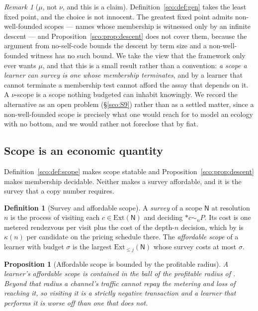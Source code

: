 \documentclass[11pt]{article}
\theoremstyle{plain}
\newtheorem{proposition}[theorem]{Proposition}
\theoremstyle{definition}
\newtheorem{definition}[theorem]{Definition}
\theoremstyle{remark}
\newtheorem{remark}[theorem]{Remark}
\newcommand{\Nsp}{\mathsf{N}}
\newcommand{\drop}[1]{*#1}
\newcommand{\bisimn}[1]{\sim_{#1}}
\newcommand{\Ext}{\mathrm{Ext}}
\begin{document}
\begin{remark}[$\mu$, not $\nu$, and this is a claim]\label{sco:rem:munu}
Definition~\ref{sco:def:gen} takes the least fixed point, and the choice is
not innocent. The greatest fixed point admits non-well-founded scopes ---
names whose membership is witnessed only by an infinite descent --- and
Proposition~\ref{sco:prop:descent} does not cover them, because the
argument from no-self-code bounds the descent by term size and a
non-well-founded witness has no such bound. We take the view that the
framework only ever wants $\mu$, and that this is a small result rather
than a convention: \emph{a scope a learner can survey is one whose
membership terminates}, and by \cite[\S6]{scientist} a learner that cannot
terminate a membership test cannot afford the assay that depends on it. A
$\nu$-scope is a scope nothing budgeted can inhabit knowingly. We record
the alternative as an open problem (\S\ref{sco:S9}) rather than as a
settled matter, since a non-well-founded scope is precisely what one would
reach for to model an ecology with no bottom, and we would rather not
foreclose that by fiat.
\end{remark}

\subsection{Scope is an economic quantity}\label{sco:S3.5}

Definition~\ref{sco:def:scope} makes scope statable and
Proposition~\ref{sco:prop:descent} makes membership decidable. Neither
makes a survey affordable, and it is the survey that a copy number
requires.

\begin{definition}[Survey and affordable scope]\label{sco:def:survey}
A \emph{survey} of a scope $\Nsp$ at resolution $n$ is the process of
visiting each $c \in \Ext(\Nsp)$ and deciding $\drop{c} \bisimn{n} P$. Its
cost is one metered rendezvous per visit plus the cost of the depth-$n$
decision, which by \cite[\S4]{game} is $\kappa(n)$ per candidate on the
pricing schedule there. The \emph{affordable scope} of a learner with
budget $\sigma$ is the largest $\Ext_{\le j}(\Nsp)$ whose survey costs at
most $\sigma$.
\end{definition}

\begin{proposition}[Affordable scope is bounded by the profitable radius]
\label{sco:prop:radius}
A learner's affordable scope is contained in the ball of the profitable
radius of \cite[\S7]{engine}. Beyond that radius a channel's traffic
cannot repay the metering and loss of reaching it, so visiting it is a
strictly negative transaction and a learner that performs it is worse off
than one that does not.
\end{proposition}
\end{document}
